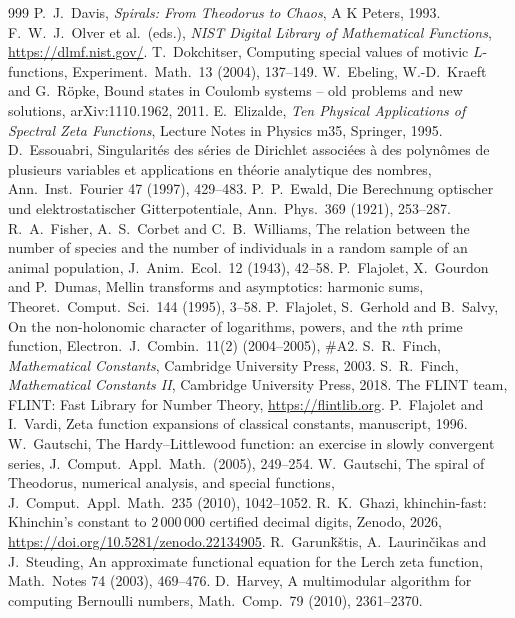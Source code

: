 \documentclass[11pt,reqno]{amsart}
\theoremstyle{definition}
\theoremstyle{remark}
\begin{document}
\begin{thebibliography}{999}
 P.~J.~Davis, \emph{Spirals: From Theodorus to Chaos}, A K Peters, 1993.
 F.~W.~J.~Olver et al.\ (eds.), \emph{NIST Digital Library of Mathematical Functions}, \url{https://dlmf.nist.gov/}.
 T.~Dokchitser, Computing special values of motivic $L$-functions, Experiment.\ Math.\ 13 (2004), 137--149.
 W.~Ebeling, W.-D.~Kraeft and G.~R\"opke, Bound states in Coulomb systems -- old problems and new solutions, arXiv:1110.1962, 2011.
 E.~Elizalde, \emph{Ten Physical Applications of Spectral Zeta Functions}, Lecture Notes in Physics m35, Springer, 1995.
 D.~Essouabri, Singularit\'es des s\'eries de Dirichlet associ\'ees \`a des polyn\^omes de plusieurs variables et applications en th\'eorie analytique des nombres, Ann.\ Inst.\ Fourier 47 (1997), 429--483.
 P.~P.~Ewald, Die Berechnung optischer und elektrostatischer Gitterpotentiale, Ann.\ Phys.\ 369 (1921), 253--287.
 R.~A.~Fisher, A.~S.~Corbet and C.~B.~Williams, The relation between the number of species and the number of individuals in a random sample of an animal population, J.\ Anim.\ Ecol.\ 12 (1943), 42--58.
 P.~Flajolet, X.~Gourdon and P.~Dumas, Mellin transforms and asymptotics: harmonic sums, Theoret.\ Comput.\ Sci.\ 144 (1995), 3--58.
 P.~Flajolet, S.~Gerhold and B.~Salvy, On the non-holonomic character of logarithms, powers, and the $n$th prime function, Electron.\ J.\ Combin.\ 11(2) (2004--2005), \#A2.
 S.~R.~Finch, \emph{Mathematical Constants}, Cambridge University Press, 2003.
 S.~R.~Finch, \emph{Mathematical Constants II}, Cambridge University Press, 2018.
 The FLINT team, FLINT: Fast Library for Number Theory, \url{https://flintlib.org}.
 P.~Flajolet and I.~Vardi, Zeta function expansions of classical constants, manuscript, 1996.
 W.~Gautschi, The Hardy--Littlewood function: an exercise in slowly convergent series, J.\ Comput.\ Appl.\ Math.\ (2005), 249--254.
 W.~Gautschi, The spiral of Theodorus, numerical analysis, and special functions, J.\ Comput.\ Appl.\ Math.\ 235 (2010), 1042--1052.
 R.~K.~Ghazi, khinchin-fast: Khinchin's constant to $2\,000\,000$ certified decimal digits, Zenodo, 2026, \url{https://doi.org/10.5281/zenodo.22134905}.
 R.~Garun\v{k}\v{s}tis, A.~Laurin\v{c}ikas and J.~Steuding, An approximate functional equation for the Lerch zeta function, Math.\ Notes 74 (2003), 469--476.
 D.~Harvey, A multimodular algorithm for computing Bernoulli numbers, Math.\ Comp.\ 79 (2010), 2361--2370.

\end{thebibliography}
\end{document}
